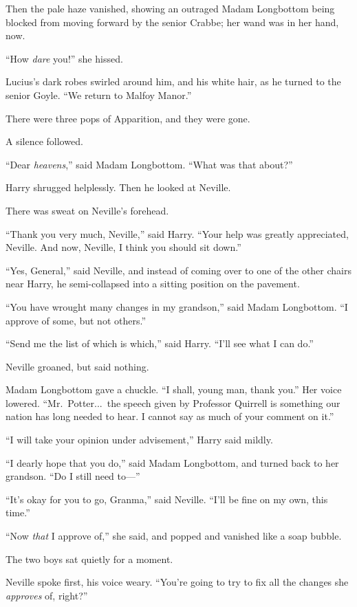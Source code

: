 Then the pale haze vanished, showing an outraged Madam Longbottom being blocked from moving forward by the senior Crabbe; her wand was in her hand, now.

“How \emph{dare} you!” she hissed.

Lucius’s dark robes swirled around him, and his white hair, as he turned to the senior Goyle. “We return to Malfoy Manor.”

There were three pops of Apparition, and they were gone.

A silence followed.

“Dear \emph{heavens},” said Madam Longbottom. “What was that about?”

Harry shrugged helplessly. Then he looked at Neville.

There was sweat on Neville’s forehead.

“Thank you very much, Neville,” said Harry. “Your help was greatly appreciated, Neville. And now, Neville, I think you should sit down.”

“Yes, General,” said Neville, and instead of coming over to one of the other chairs near Harry, he semi-collapsed into a sitting position on the pavement.

“You have wrought many changes in my grandson,” said Madam Longbottom. “I approve of some, but not others.”

“Send me the list of which is which,” said Harry. “I’ll see what I can do.”

Neville groaned, but said nothing.

Madam Longbottom gave a chuckle. “I shall, young man, thank you.” Her voice lowered. “Mr.~Potter...\ the speech given by Professor Quirrell is something our nation has long needed to hear. I cannot say as much of your comment on it.”

“I will take your opinion under advisement,” Harry said mildly.

“I dearly hope that you do,” said Madam Longbottom, and turned back to her grandson. “Do I still need to—”

“It’s okay for you to go, Granma,” said Neville. “I’ll be fine on my own, this time.”

“Now \emph{that} I approve of,” she said, and popped and vanished like a soap bubble.

The two boys sat quietly for a moment.

Neville spoke first, his voice weary. “You’re going to try to fix all the changes she \emph{approves} of, right?”

